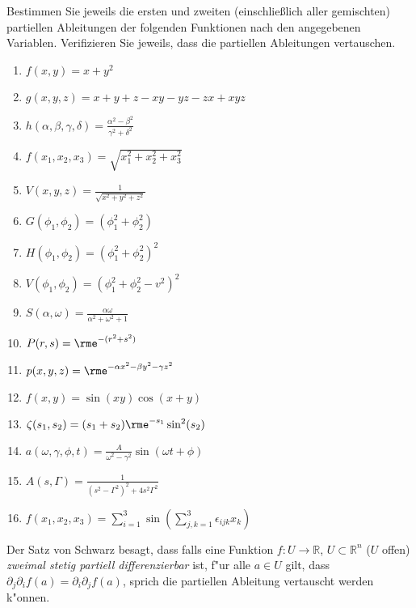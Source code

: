 \documentclass[11pt,answers]{exam}
\begin{document}
\begin{questions}
Bestimmen Sie jeweils die ersten und zweiten (einschließlich aller gemischten)
partiellen Ableitungen der folgenden Funktionen nach den angegebenen Variablen.
Verifizieren Sie jeweils, dass die partiellen Ableitungen vertauschen.\\
\parbox{0.5\textwidth}{\begin{enumerate}
\item $f(x,y)=x+y^2$
\item $g(x,y,z)=x+y+z-xy-yz-zx+xyz$
\item $h(\alpha,\beta,\gamma,\delta)=\frac{\alpha^2-\beta^2}{\gamma^2+\delta^2}$
\item $f(x_1,x_2,x_3)=\sqrt{x_1^2+x_2^2+x_3^2}$
\item $V(x,y,z)=\frac{1}{\sqrt{x^2+y^2+z^2}}$
\item $G(\phi_1,\phi_2)=(\phi_1^2+\phi_2^2)$
\item $H(\phi_1,\phi_2)=(\phi_1^2+\phi_2^2)^2$
\item $V(\phi_1,\phi_2)=\left(\phi_1^2+\phi_2^2-v^2\right)^2$
\end{enumerate}}\parbox{0.5\textwidth}{\begin{enumerate}\setcounter{enumi}{8}
\item $S(\alpha,\omega)=\frac{\alpha\omega}{\alpha^2+\omega^2+1}$
\item $P(r,s)=\rme^{-(r^2+s^2)}$
\item $p(x,y,z)=\rme^{-\alpha x^2-\beta y^2-\gamma z^2}$
\item $f(x,y)=\sin(xy)\cos(x+y)$
\item $\zeta(s_1,s_2)=(s_1+s_2)\rme^{-s_1}\sin^2(s_2)$
\item $a(\omega,\gamma,\phi,t)=\frac{A}{\omega^2-\gamma^2}\sin(\omega t+\phi)$
\item $A(s,\Gamma)=\frac{1}{(s^2-\Gamma^2)^2+4s^2\Gamma^2}$
\item $f(x_1,x_2,x_3)=\sum_{i=1}^3\sin\left(\sum_{j,k=1}^3\epsilon_{ijk}x_k\right)$
\end{enumerate}}
\begin{solution}Der Satz von Schwarz besagt, dass falls eine Funktion
$f:U\to\mathbb{R}$, $U\subset\mathbb{R}^n$ ($U$ offen) 
\textit{zweimal stetig partiell differenzierbar} ist, f"ur alle $a\in U$ gilt, dass $\partial_j\partial_if(a)
=\partial_i\partial_jf(a)$, sprich die partiellen Ableitung vertauscht werden k"onnen.


\end{solution}
\end{questions}
\end{document}
